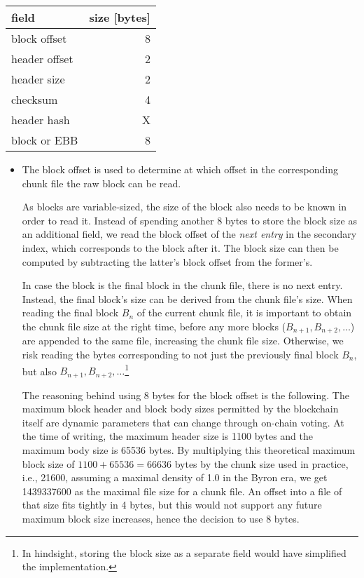 \begin{center}
\begin{tabular}{l r}
  field & size [bytes] \\
  \hline
  block offset  & 8 \\
  header offset & 2 \\
  header size   & 2 \\
  checksum      & 4 \\
  header hash   & X \\
  block or EBB  & 8 \\
\end{tabular}
\end{center}

\begin{itemize}
\item The block offset is used to determine at which offset in the corresponding
  chunk file the raw block can be read.

  As blocks are variable-sized, the size of the block also needs to be known in
  order to read it. Instead of spending another 8 bytes to store the block size
  as an additional field, we read the block offset of the \emph{next entry} in
  the secondary index, which corresponds to the block after it. The block size
  can then be computed by subtracting the latter's block offset from the
  former's.

  In case the block is the final block in the chunk file, there is no next
  entry. Instead, the final block's size can be derived from the chunk file's
  size. When reading the final block $B_n$ of the current chunk file, it is
  important to obtain the chunk file size at the right time, before any more
  blocks ($B_{n+1}, B_{n+2}, \ldots$) are appended to the same file, increasing the
  chunk file size. Otherwise, we risk reading the bytes corresponding to not
  just the previously final block $B_n$, but also $B_{n+1}, B_{n+2},
  \ldots$\footnote{In hindsight, storing the block size as a separate field would
  have simplified the implementation.}

  The reasoning behind using 8 bytes for the block offset is the following. The
  maximum block header and block body sizes permitted by the blockchain itself
  are dynamic parameters that can change through on-chain voting. At the time of
  writing, the maximum header size is 1100 bytes and the maximum body size is
  \num{65536} bytes. By multiplying this theoretical maximum block size of
  $\num{1100} + \num{65536} = \num{66636}$ bytes by the chunk size used in
  practice, i.e., \num{21600}, assuming a maximal density of 1.0 in the Byron
  era, we get \num{1439337600} as the maximal file size for a chunk file. An
  offset into a file of that size fits tightly in 4 bytes, but this would not
  support any future maximum block size increases, hence the decision to use 8
  bytes.


\end{itemize}
